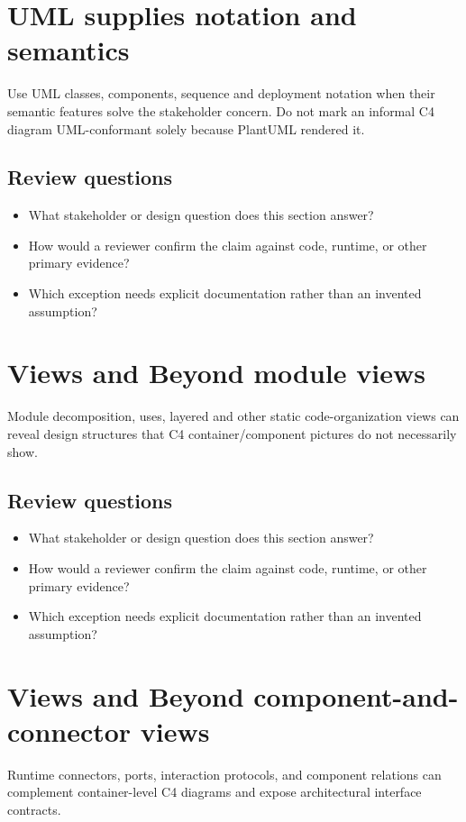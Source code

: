 \documentclass[10pt,letterpaper]{article}
\begin{document}
\section{UML supplies notation and semantics}
Use UML classes, components, sequence and deployment notation when their semantic features solve the stakeholder concern. Do not mark an informal C4 diagram UML-conformant solely because PlantUML rendered it.


\subsection{Review questions}
\begin{itemize}
\item What stakeholder or design question does this section answer?
\item How would a reviewer confirm the claim against code, runtime, or other primary evidence?
\item Which exception needs explicit documentation rather than an invented assumption?
\end{itemize}

\section{Views and Beyond module views}
Module decomposition, uses, layered and other static code-organization views can reveal design structures that C4 container/component pictures do not necessarily show.


\subsection{Review questions}
\begin{itemize}
\item What stakeholder or design question does this section answer?
\item How would a reviewer confirm the claim against code, runtime, or other primary evidence?
\item Which exception needs explicit documentation rather than an invented assumption?
\end{itemize}

\section{Views and Beyond component-and-connector views}
Runtime connectors, ports, interaction protocols, and component relations can complement container-level C4 diagrams and expose architectural interface contracts.
\end{document}
